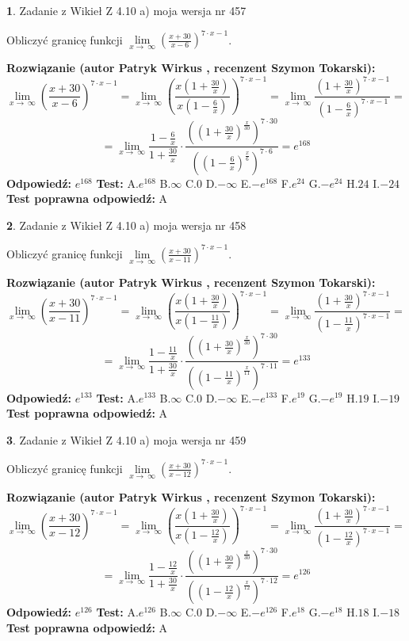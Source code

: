 \documentclass[12pt, a4paper]{article}
\theoremstyle{definition} %
\newtheorem{zad}{}
\newcommand{\zadStart}[1]{\begin{zad}#1\newline}
\newcommand{\zadStop}{\end{zad}}
\newcommand{\rozwStart}[2]{\noindent \textbf{Rozwiązanie (autor #1 , recenzent #2): }\newline}
\newcommand{\rozwStop}{\newline}
\newcommand{\odpStart}{\noindent \textbf{Odpowiedź:}\newline}
\newcommand{\odpStop}{\newline}
\newcommand{\testStart}{\noindent \textbf{Test:}\newline}
\newcommand{\testStop}{\newline}
\newcommand{\kluczStart}{\noindent \textbf{Test poprawna odpowiedź:}\newline}
\newcommand{\kluczStop}{\newline}
\begin{document}
\zadStart{Zadanie z Wikieł Z 4.10 a) moja wersja nr 457}

Obliczyć granicę funkcji  $\lim\limits_{x\to\ \infty}(\frac{x+30}{x-6})^{7\cdot x-1}$.
\zadStop
\rozwStart{Patryk Wirkus}{Szymon Tokarski}
$$\lim\limits_{x\to\ \infty}(\frac{x+30}{x-6})^{7\cdot x-1} = \lim\limits_{x\to\ \infty}(\frac{x(1+\frac{30}{x})}{x(1-\frac{6}{x})})^{7\cdot x-1}=\lim\limits_{x\to\ \infty}\frac{(1+\frac{30}{x})^{7\cdot x-1}}{(1-\frac{6}{x})^{7\cdot x-1}}=$$
$$=\lim\limits_{x\to\ \infty}\frac{1-\frac{6}{x}}{1+\frac{30}{x}}\cdot\frac{((1+\frac{30}{x})^{\frac{x}{30}})^{7\cdot30}}{((1-\frac{6}{x})^{\frac{x}{6}})^{7\cdot6}}=e^{168}$$
\rozwStop
\odpStart
$e^{168}$
\odpStop
\testStart
A.$e^{168}$ B.$\infty$ C.$0$ D.$-\infty$ E.$-e^{168}$
F.$e^{24}$ G.$-e^{24}$
H.$24$
I.$-24$
\testStop
\kluczStart
A
\kluczStop



\zadStart{Zadanie z Wikieł Z 4.10 a) moja wersja nr 458}

Obliczyć granicę funkcji  $\lim\limits_{x\to\ \infty}(\frac{x+30}{x-11})^{7\cdot x-1}$.
\zadStop
\rozwStart{Patryk Wirkus}{Szymon Tokarski}
$$\lim\limits_{x\to\ \infty}(\frac{x+30}{x-11})^{7\cdot x-1} = \lim\limits_{x\to\ \infty}(\frac{x(1+\frac{30}{x})}{x(1-\frac{11}{x})})^{7\cdot x-1}=\lim\limits_{x\to\ \infty}\frac{(1+\frac{30}{x})^{7\cdot x-1}}{(1-\frac{11}{x})^{7\cdot x-1}}=$$
$$=\lim\limits_{x\to\ \infty}\frac{1-\frac{11}{x}}{1+\frac{30}{x}}\cdot\frac{((1+\frac{30}{x})^{\frac{x}{30}})^{7\cdot30}}{((1-\frac{11}{x})^{\frac{x}{11}})^{7\cdot11}}=e^{133}$$
\rozwStop
\odpStart
$e^{133}$
\odpStop
\testStart
A.$e^{133}$ B.$\infty$ C.$0$ D.$-\infty$ E.$-e^{133}$
F.$e^{19}$ G.$-e^{19}$
H.$19$
I.$-19$
\testStop
\kluczStart
A
\kluczStop



\zadStart{Zadanie z Wikieł Z 4.10 a) moja wersja nr 459}

Obliczyć granicę funkcji  $\lim\limits_{x\to\ \infty}(\frac{x+30}{x-12})^{7\cdot x-1}$.
\zadStop
\rozwStart{Patryk Wirkus}{Szymon Tokarski}
$$\lim\limits_{x\to\ \infty}(\frac{x+30}{x-12})^{7\cdot x-1} = \lim\limits_{x\to\ \infty}(\frac{x(1+\frac{30}{x})}{x(1-\frac{12}{x})})^{7\cdot x-1}=\lim\limits_{x\to\ \infty}\frac{(1+\frac{30}{x})^{7\cdot x-1}}{(1-\frac{12}{x})^{7\cdot x-1}}=$$
$$=\lim\limits_{x\to\ \infty}\frac{1-\frac{12}{x}}{1+\frac{30}{x}}\cdot\frac{((1+\frac{30}{x})^{\frac{x}{30}})^{7\cdot30}}{((1-\frac{12}{x})^{\frac{x}{12}})^{7\cdot12}}=e^{126}$$
\rozwStop
\odpStart
$e^{126}$
\odpStop
\testStart
A.$e^{126}$ B.$\infty$ C.$0$ D.$-\infty$ E.$-e^{126}$
F.$e^{18}$ G.$-e^{18}$
H.$18$
I.$-18$
\testStop
\kluczStart
A
\kluczStop
\end{document}
